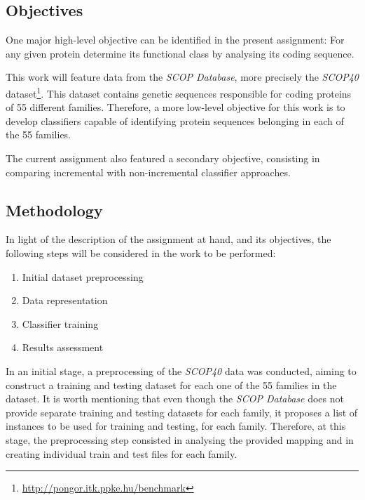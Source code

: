 \documentclass[11pt]{article}
\begin{document}
\subsection{Objectives}

One major high-level objective can be identified in the present assignment: For any given protein determine its functional class by analysing its coding sequence.

This work will feature data from the \emph{SCOP Database}\cite{murzin1995scop}, more precisely the \emph{SCOP40} dataset\footnote{\url{http://pongor.itk.ppke.hu/benchmark}}. This dataset contains genetic sequences responsible for coding proteins of 55 different families. Therefore, a more low-level objective for this work is to develop classifiers capable of identifying protein sequences belonging in each of the 55 families.

The current assignment also featured a secondary objective, consisting in comparing incremental with non-incremental classifier approaches. 

\subsection{Methodology}
\label{methodology}

In light of the description of the assignment at hand, and its objectives, the following steps will be considered in the work to be performed:

\begin{enumerate}
	\item Initial dataset preprocessing
	
	\item Data representation
	
	\item Classifier training
	
	\item Results assessment
\end{enumerate}

In an initial stage, a preprocessing of the \emph{SCOP40} data was conducted, aiming to construct a training and testing dataset for each one of the 55 families in the dataset. It is worth mentioning that even though the \emph{SCOP Database} does not provide separate training and testing datasets for each family, it proposes a list of instances to be used for training and testing, for each family. Therefore, at this stage, the preprocessing step consisted in analysing the provided mapping and in creating individual train and test files for each family.
\end{document}
